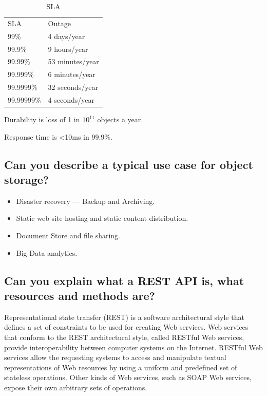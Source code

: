 \documentclass{article}
\begin{document}
\begin{table}
  \centering
  \begin{tabular}{ll}
    \toprule
    SLA & Outage \\
    99\% & 4 days/year\\
    99.9\% & 9 hours/year\\
    99.99\% & 53 minutes/year\\
    99.999\% & 6 minutes/year\\
    99.9999\% & 32 seconds/year\\
    99.99999\% & 4 seconds/year\\
    \bottomrule
  \end{tabular}
  \label{tab:sla}
  \caption{SLA}
\end{table}

Durability is loss of 1 in $10^{11}$ objects a year.

Response time is <10ms in $99.9\%$.

\subsection{Can you describe a typical use case for object storage?}


\begin{itemize}
\item Disaster recovery — Backup and Archiving.
\item Static web site hosting and static content distribution.
\item Document Store and file sharing.
\item Big Data analytics.
\end{itemize}

\subsection{Can you explain what a REST API is, what resources and methods are?}


Representational state transfer (REST) is a software architectural style that defines a set of constraints to be used for creating Web services. Web services that conform to the REST architectural style, called RESTful Web services, provide interoperability between computer systems on the Internet. RESTful Web services allow the requesting systems to access and manipulate textual representations of Web resources by using a uniform and predefined set of stateless operations. Other kinds of Web services, such as SOAP Web services, expose their own arbitrary sets of operations.
\end{document}
